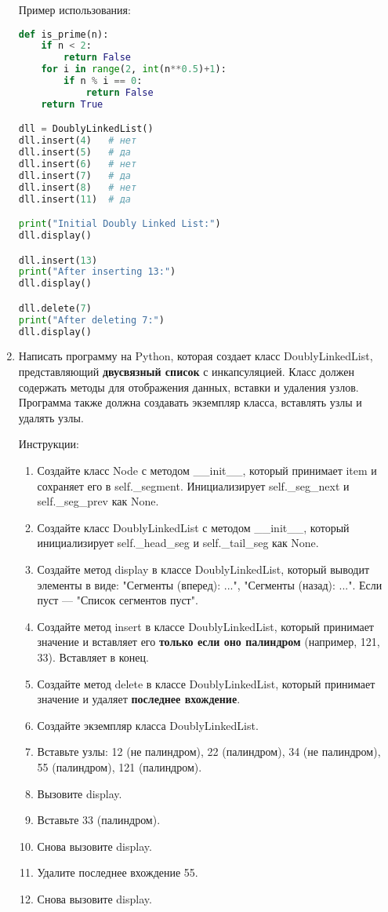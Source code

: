 \begin{enumerate}
Пример использования:
\begin{lstlisting}[language=Python]
def is_prime(n):
    if n < 2:
        return False
    for i in range(2, int(n**0.5)+1):
        if n % i == 0:
            return False
    return True

dll = DoublyLinkedList()
dll.insert(4)   # нет
dll.insert(5)   # да
dll.insert(6)   # нет
dll.insert(7)   # да
dll.insert(8)   # нет
dll.insert(11)  # да

print("Initial Doubly Linked List:")
dll.display()

dll.insert(13)
print("After inserting 13:")
dll.display()

dll.delete(7)
print("After deleting 7:")
dll.display()
\end{lstlisting}

\item Написать программу на Python, которая создает класс DoublyLinkedList, представляющий \textbf{двусвязный список} с инкапсуляцией. Класс должен содержать методы для отображения данных, вставки и удаления узлов. Программа также должна создавать экземпляр класса, вставлять узлы и удалять узлы.

Инструкции:
\begin{enumerate}
    \item Создайте класс Node с методом \_\_init\_\_, который принимает item и сохраняет его в self.\_segment. Инициализирует self.\_seg\_next и self.\_seg\_prev как None.
    \item Создайте класс DoublyLinkedList с методом \_\_init\_\_, который инициализирует self.\_head\_seg и self.\_tail\_seg как None.
    \item Создайте метод display в классе DoublyLinkedList, который выводит элементы в виде: "Сегменты (вперед): ...", "Сегменты (назад): ...". Если пуст — "Список сегментов пуст".
    \item Создайте метод insert в классе DoublyLinkedList, который принимает значение и вставляет его \textbf{только если оно палиндром} (например, 121, 33). Вставляет в конец.
    \item Создайте метод delete в классе DoublyLinkedList, который принимает значение и удаляет \textbf{последнее вхождение}.
    \item Создайте экземпляр класса DoublyLinkedList.
    \item Вставьте узлы: 12 (не палиндром), 22 (палиндром), 34 (не палиндром), 55 (палиндром), 121 (палиндром).
    \item Вызовите display.
    \item Вставьте 33 (палиндром).
    \item Снова вызовите display.
    \item Удалите последнее вхождение 55.
    \item Снова вызовите display.
\end{enumerate}


\end{enumerate}
